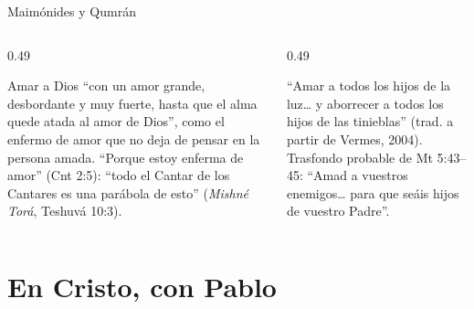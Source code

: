 \begin{frame}{Maimónides y Qumrán}
\begin{columns}[t,onlytextwidth]
\begin{column}{0.49\textwidth}
\begin{tcolorbox}[colback=papiro,colframe=azul,boxrule=0.8pt,arc=3pt,title={Maimónides: el enfermo de amor},coltitle=papiro,colbacktitle=azul,fonttitle=\scriptsize\bfseries]
\scriptsize Amar a Dios ``con un amor grande, desbordante y muy fuerte, hasta que el alma quede atada al amor de Dios'', como el enfermo de amor que no deja de pensar en la persona amada. ``Porque estoy enferma de amor'' (Cnt 2:5): ``todo el Cantar de los Cantares es una parábola de esto'' (\emph{Mishné Torá}, Teshuvá 10:3).
\end{tcolorbox}
\end{column}
\begin{column}{0.49\textwidth}
\begin{tcolorbox}[colback=papiro,colframe=azul,boxrule=0.8pt,arc=3pt,title={Qumrán: 1QS I 9--10},coltitle=papiro,colbacktitle=azul,fonttitle=\scriptsize\bfseries]
\scriptsize ``Amar a todos los hijos de la luz\ldots{} y aborrecer a todos los hijos de las tinieblas'' (trad. a partir de Vermes, 2004). Trasfondo probable de Mt 5:43--45: ``Amad a vuestros enemigos\ldots{} para que seáis hijos de vuestro Padre''.
\end{tcolorbox}
\end{column}
\end{columns}
\end{frame}

\section{En Cristo, con Pablo}

